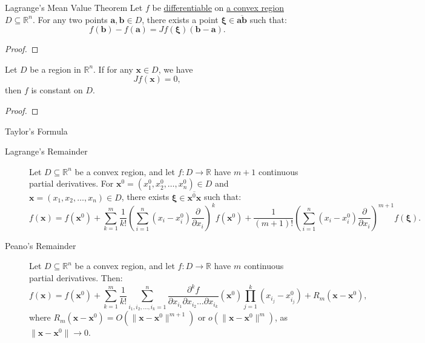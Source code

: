 \documentclass[11pt]{elegantbook}
\begin{document}
\begin{theorem}{Lagrange's Mean Value Theorem}
    Let \(f\) be \underline{differentiable} on \underline{a convex region} \(D \subseteq \mathbb{R}^n\). 
    For any two points \(\mathbf{a}, \mathbf{b} \in D\), 
    there exists a point \(\mathbf{\xi}\in \overline{\mathbf{a} \mathbf{b}}\)
    such that:  
    \[
    f(\mathbf{b}) - f(\mathbf{a}) = Jf(\mathbf{\xi})(\mathbf{b} - \mathbf{a}).
    \]
\end{theorem}

\begin{proof}
    
\end{proof}

\begin{theorem}
    Let \(D\) be a region in \(\mathbb{R}^n\). If for any \(\mathbf{x} \in D\), we have  
    \[
    Jf(\mathbf{x}) = 0,
    \]
    then \(f\) is constant on \(D\).
\end{theorem}

\begin{proof}
    
\end{proof}

\begin{theorem}{Taylor's Formula}
    \begin{description}
        \item[Lagrange's Remainder]  Let \(D \subseteq \mathbb{R}^n\) be a convex region, 
            and let \(f: D \to \mathbb{R}\) have \(m+1\) continuous partial derivatives. 
            For \(\mathbf{x}^0 = (x_1^0, x_2^0, \dots, x_n^0) \in D\) and \(\mathbf{x} = (x_1, x_2, \dots, x_n) \in D\), 
            there exists \(\mathbf{\xi} \in \overline{\mathbf{x}^0 \mathbf{x}}\) such that:  
            \[
            f(\mathbf{x}) = f(\mathbf{x}^0) 
            + \sum_{k=1}^m \frac{1}{k!} \left( \sum_{i=1}^n (x_i - x_i^0) \frac{\partial}{\partial x_i} \right)^k f(\mathbf{x}^0) 
            + \frac{1}{(m+1)!} \left( \sum_{i=1}^n (x_i - x_i^0) \frac{\partial}{\partial x_i} \right)^{m+1} f(\mathbf{\xi}).
            \]
        \item[Peano's Remainder] Let \(D \subseteq \mathbb{R}^n\) be a convex region, 
            and let \(f: D \to \mathbb{R}\) have \(m\) continuous partial derivatives. 
            Then:
            \[
            f(\mathbf{x}) = f(\mathbf{x}^0) 
            + \sum_{k=1}^m \frac{1}{k!} \sum_{i_1, i_2, \dots, i_k=1}^n 
            \frac{\partial^k f}{\partial x_{i_1} \partial x_{i_2} \dots \partial x_{i_k}}(\mathbf{x}^0) 
            \prod_{j=1}^{k} (x_{i_j} - x_{i_j}^0) 
            + R_m(\mathbf{x} - \mathbf{x}^0),
            \]
            where \(R_m(\mathbf{x} - \mathbf{x}^0) = O(\|\mathbf{x} - \mathbf{x}^0\|^{m+1})\) or \(o(\|\mathbf{x} - \mathbf{x}^0\|^{m})\), as \(\|\mathbf{x} - \mathbf{x}^0\| \to 0\).

    \end{description}
\end{theorem}
\end{document}
